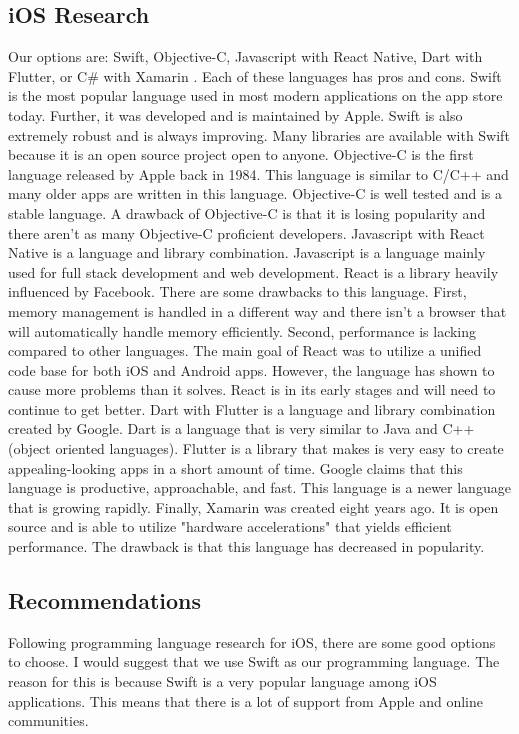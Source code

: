 \documentclass[onecolumn, draftclsnofoot,10pt, journal, letterpaper]{IEEEtran}
\begin{document}
    \subsection{iOS Research}
        Our options are: Swift, Objective-C, Javascript with React Native, Dart with Flutter, or C\# with Xamarin \cite{chungWhatLanguageAre}. Each of these languages has pros and cons. Swift is the most popular language used in most modern applications on the app store today. Further, it was developed and is maintained by Apple. Swift is also extremely robust and is always improving. Many libraries are available with Swift because it is an open source project open to anyone. Objective-C is the first language released by Apple back in 1984. This language is similar to C/C++ and many older apps are written in this language. Objective-C is well tested and is a stable language. A drawback of Objective-C is that it is losing popularity and there aren't as many Objective-C proficient developers. Javascript with React Native is a language and library combination. Javascript is a language mainly used for full stack development and web development. React is a library heavily influenced by Facebook. There are some drawbacks to this language. First, memory management is handled in a different way and there isn't a browser that will automatically handle memory efficiently. Second, performance is lacking compared to other languages. The main goal of React was to utilize a unified code base for both iOS and Android apps. However, the language has shown to cause more problems than it solves. React is in its early stages and will need to continue to get better. Dart with Flutter is a language and library combination created by Google. Dart is a language that is very similar to Java and C++ (object oriented languages). Flutter is a library that makes is very easy to create appealing-looking apps in a short amount of time. Google claims that this language is productive, approachable, and fast. This language is a newer language that is growing rapidly. Finally, Xamarin was created eight years ago. It is open source and is able to utilize "hardware accelerations" that yields efficient performance. The drawback is that this language has decreased in popularity.
    
    \subsection{Recommendations}
        Following programming language research for iOS, there are some good options to choose. I would suggest that we use Swift as our programming language. The reason for this is because Swift is a very popular language among iOS applications. This means that there is a lot of support from Apple and online communities. 
\end{document}
